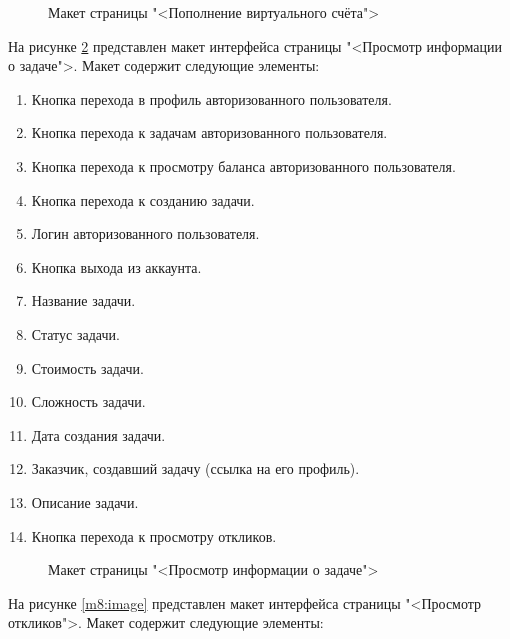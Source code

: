 \begin{figure}[ht]
	\caption{Макет страницы "<Пополнение виртуального счёта">}
	\label{m6:image}
\end{figure}

На рисунке \ref{m7:image} представлен макет интерфейса страницы "<Просмотр информации о задаче">. Макет содержит следующие элементы:

\begin{enumerate}
	\item Кнопка перехода в профиль авторизованного пользователя.
	\item Кнопка перехода к задачам авторизованного пользователя.
	\item Кнопка перехода к просмотру баланса авторизованного пользователя.
	\item Кнопка перехода к созданию задачи.
	\item Логин авторизованного пользователя.
	\item Кнопка выхода из аккаунта.
	\item Название задачи.
	\item Статус задачи.
	\item Стоимость задачи.
	\item Сложность задачи.
	\item Дата создания задачи.
	\item Заказчик, создавший задачу (ссылка на его профиль).
	\item Описание задачи.
	\item Кнопка перехода к просмотру откликов.
\end{enumerate}

\begin{figure}[ht]
	\caption{Макет страницы "<Просмотр информации о задаче">}
	\label{m7:image}
\end{figure}

На рисунке \ref{m8:image} представлен макет интерфейса страницы "<Просмотр откликов">. Макет содержит следующие элементы:

